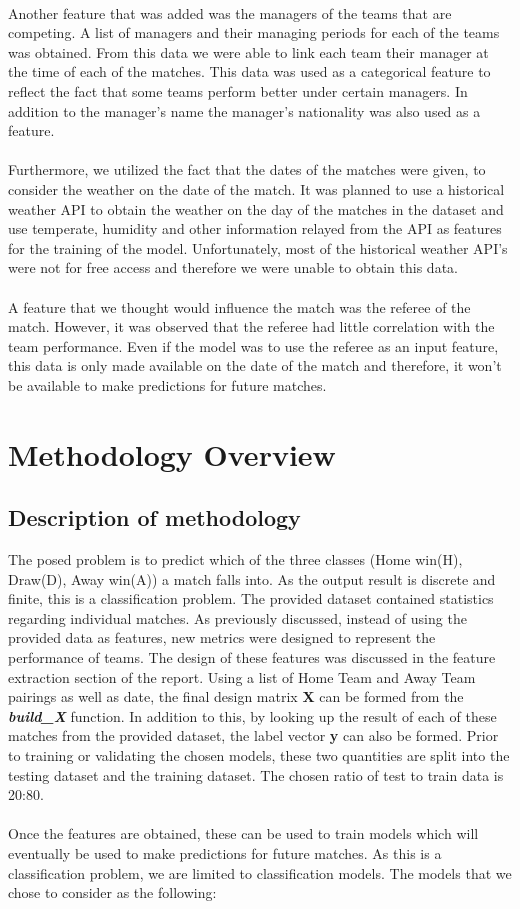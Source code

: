 \documentclass[a4paper,12pt]{article}
\begin{document}
	\\
	Another feature that was added was the managers of the teams that are competing. A list of managers and their managing periods for each of the teams was obtained. From this data we were able to link each team their manager at the time of each of the matches. This data was used as a categorical feature to reflect the fact that some teams perform better under certain managers. In addition to the manager’s name the manager’s nationality was also used as a feature. \\
	\\
	Furthermore, we utilized the fact that the dates of the matches were given, to consider the weather on the date of the match. It was planned to use a historical weather API to obtain the weather on the day of the matches in the dataset and use temperate, humidity and other information relayed from the API as features for the training of the model. Unfortunately, most of the historical weather API’s were not for free access and therefore we were unable to obtain this data. \\
	\\
	A feature that we thought would influence the match was the referee of the match. However, it was observed that the referee had little correlation with the team performance. Even if the model was to use the referee as an input feature, this data is only made available on the date of the match and therefore, it won’t be available to make predictions for future matches. 
	
	
	\section{Methodology Overview}
	
	\subsection{Description of methodology}
	The posed problem is to predict which of the three classes (Home win(H), Draw(D), Away win(A)) a match falls into. As the output result is discrete and finite, this is a classification problem. The provided dataset contained statistics regarding individual matches. As previously discussed, instead of using the provided data as features, new metrics were designed to represent the performance of teams. The design of these features was discussed in the feature extraction section of the report. Using a list of Home Team and Away Team pairings as well as date, the final design matrix \textbf{X} can be formed from the \textbf{\textit{build\_X}} function. In addition to this, by looking up the result of each of these matches from the provided dataset, the label vector \textbf{y} can also be formed. Prior to training or validating the chosen models, these two quantities are split into the testing dataset and the training dataset. The chosen ratio of test to train data is 20:80. \\
	\\
	Once the features are obtained, these can be used to train models which will eventually be used to make predictions for future matches. As this is a classification problem, we are limited to classification models. The models that we chose to consider as the following:
	
\end{document}
